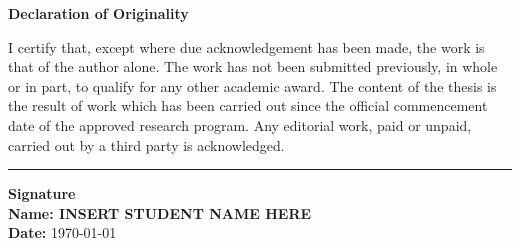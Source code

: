 \textbf{Declaration of Originality} \par
\vspace{0.5cm}
I certify that, except where due acknowledgement has been made, the work is
that of the author alone. The work has not been submitted previously, in whole
or in part, to qualify for any other academic award. The content of the thesis is the result of work which has been carried out since the official commencement
date of the approved research program. Any editorial work, paid or unpaid,
carried out by a third party is acknowledged.
\par \vspace{4cm} %
\rule{0.5\textwidth}{0.4pt} %
\par \textbf{Signature}  \\
\vspace{0.5cm}
\textbf{Name: INSERT STUDENT NAME HERE}  \\
\vspace{0.5cm}
\textbf{Date:} \today
